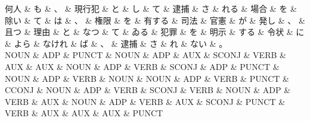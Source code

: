 \documentclass[tikz,border=5pt]{standalone}
\begin{document}
\small
\begin{dependency}[edge unit distance=8.9pt]
    \begin{deptext}[column sep=0.5em]
        何人 \& も \& 、 \& 現行犯 \& と \& し \& て \& 逮捕 \& さ \& れる \& 場合 \& を \& 除い \& て \& は \& 、 \& 権限 \& を \& 有する \& 司法 \& 官憲 \& が \& 発し \& 、 \& 且つ \& 理由 \& と \& なつ \& て \& ゐる \& 犯罪 \& を \& 明示 \& する \& 令状 \& に \& よら \& なけれ \& ば \& 、 \& 逮捕 \& さ \& れ \& ない \& 。\\
        NOUN \& ADP \& PUNCT \& NOUN \& ADP \& AUX \& SCONJ \& VERB \& AUX \& AUX \& NOUN \& ADP \& VERB \& SCONJ \& ADP \& PUNCT \& NOUN \& ADP \& VERB \& NOUN \& NOUN \& ADP \& VERB \& PUNCT \& CCONJ \& NOUN \& ADP \& VERB \& SCONJ \& VERB \& NOUN \& ADP \& VERB \& AUX \& NOUN \& ADP \& VERB \& AUX \& SCONJ \& PUNCT \& VERB \& AUX \& AUX \& AUX \& PUNCT\\
    \end{deptext}
\end{dependency}
\end{document}
